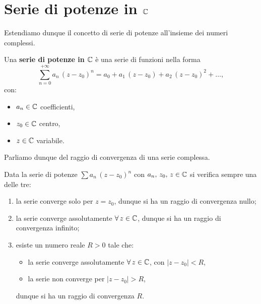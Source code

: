 \documentclass[../../analisi2]{subfiles}
\begin{document}
    \chapter{Serie di potenze in \texorpdfstring{\(\mathbb{C}\)}{C}}

        Estendiamo dunque il concetto di serie di potenze all'insieme dei numeri complessi.

        \begin{definizione}
            Una \textbf{serie di potenze in \(\mathbb{C}\)} è una serie di funzioni nella forma
            \[
                \sum_{n = 0}^{+\infty} a_n \, (z - z_0)^n = a_0 + a_1 \, (z - z_0) + a_2 \, (z - z_0)^2 + \ldots,
            \]
            con:
            \begin{itemize}
                \item \(a_n \in \mathbb{C}\) coefficienti,
                \item \(z_0 \in \mathbb{C}\) centro,
                \item \(z \in \mathbb{C}\) variabile.
            \end{itemize}
        \end{definizione}

        Parliamo dunque del raggio di convergenza di una serie complessa.

        \begin{teorema}
            Data la serie di potenze \(\sum a_n \, (z - z_0)^n\) con \(a_n, \, z_0, \, z \in \mathbb{C}\) si verifica sempre una delle
            tre:
            \begin{enumerate}
                \item la serie converge solo per \(z = z_0\), dunque si ha un raggio di convergenza nullo;
                \item la serie converge assolutamente \(\forall \, z \in \mathbb{C}\), dunque si ha un raggio di convergenza infinito;
                \item esiste un numero reale \(R > 0\) tale che:
                    \begin{itemize}
                        \item la serie converge assolutamente \(\forall \, z \in \mathbb{C}\), con \(| z - z_0 | < R\),
                        \item la serie non converge per \(| z - z_0 | > R\),
                    \end{itemize}
                    dunque si ha un raggio di convergenza \(R\).
            \end{enumerate}
        \end{teorema}
\end{document}
